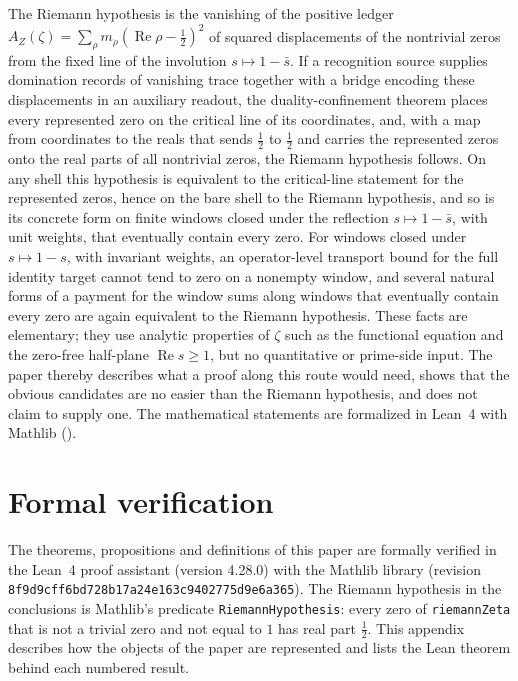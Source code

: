 \documentclass[11pt]{article}
\DeclareMathOperator{\Real}{Re}
\newcommand{\AZ}{A_{Z}(\zeta)}
\theoremstyle{definition}
\DeclareRobustCommand{\leanid}[1]{{\def\UrlBreaks{\do\.\do\_}\def\UrlBigBreaks{}\def\UrlNoBreaks{}\nolinkurl{#1}}}
\begin{document}
The Riemann hypothesis is the vanishing of the positive ledger
\(\AZ=\sum_\rho m_\rho(\Real\rho-\frac12)^2\) of squared displacements of
the nontrivial zeros from the fixed line of the involution
\(s\mapsto1-\bar s\).  If a recognition source supplies domination
records of vanishing trace together with a bridge encoding these displacements in an auxiliary
readout, the duality-confinement theorem places every represented zero on the
critical line of its coordinates, and, with a map from coordinates to the reals that sends \(\frac12\) to
\(\frac12\) and carries the represented zeros onto the real parts of all
nontrivial zeros, the Riemann hypothesis follows.  On any shell this
hypothesis is equivalent to the critical-line statement for the
represented zeros, hence on the bare shell to the Riemann hypothesis, and so
is its concrete form on finite windows closed under the reflection
\(s\mapsto1-\bar s\), with unit weights, that eventually contain every
zero.  For windows closed under \(s\mapsto1-s\), with invariant weights, an
operator-level transport bound for the full identity target cannot
tend to zero on a nonempty window, and several natural forms of a
payment for the window sums along windows that eventually contain
every zero are again equivalent to the Riemann hypothesis.  These facts are elementary; they use analytic properties of \(\zeta\)
such as the functional equation and the zero-free half-plane
\(\Real s\geq1\), but no quantitative or prime-side input.  The paper thereby
describes what a proof along this route would need, shows that the
obvious candidates are no easier than the Riemann hypothesis, and does
not claim to supply one.  The mathematical statements are formalized in Lean~4 with Mathlib
().

\appendix
{}
\section{Formal verification}
\label{app:formalization}

The theorems, propositions and definitions of this paper are formally
verified in the Lean~4 proof assistant (version 4.28.0) with the Mathlib library (revision
\leanid{8f9d9cff6bd728b17a24e163c9402775d9e6a365}).  The Riemann
hypothesis in the conclusions is Mathlib's predicate
\texttt{RiemannHypothesis}: every zero of \texttt{riemannZeta} that is
not a trivial zero and not equal to \(1\) has real part \(\frac12\).
This appendix describes how the objects of the paper are represented
and lists the Lean theorem behind each numbered result.
\end{document}
